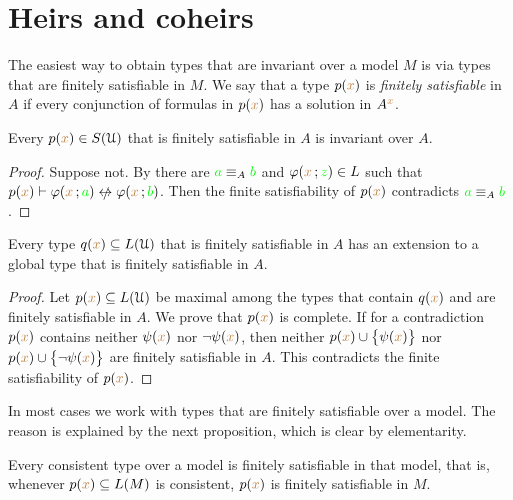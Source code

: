 \section{Heirs and coheirs}
\label{coheirs}

\def\medrel#1{\parbox[t]{6ex}{$\displaystyle\hfil #1$}}
\def\ceq#1#2#3{\parbox[t]{16ex}{$\displaystyle #1$}\medrel{#2}{$\displaystyle #3$}}

The easiest way to obtain types that are invariant over a model $M$ is via types that are finitely satisfiable in $M$.
We say that a type $p({\color{brown} x})$ is \emph{finitely satisfiable\/} in $A$ if every conjunction of formulas in $p({\color{brown} x})$ has a solution in $A^{\color{brown} x}$.

\begin{proposition}\label{prop_coeredi_quasiinvarienti}
  Every $p({\color{brown} x})\in S(\EuScript U)$ that is finitely satisfiable in $A$ is invariant over $A$.
\end{proposition}

\begin{proof}
  Suppose not.
  By  there are ${\color{green} a}\equiv_A{\color{green} b}$ and $\varphi({\color{brown} x}\,;{\color{green} z})\in L$ such that $p({\mr x})\proves\phi({\mr x}\,;{\gr a})\niff\phi({\mr x}\,;{\gr b})$.
  Then the finite satisfiability of $p({\color{brown} x})$ contradicts ${\color{green} a}\equiv_A{\color{green} b}$.
\end{proof}

\begin{proposition}\label{prop_exisntence_coheirs}
  Every type $q({\color{brown} x})\subseteq L(\EuScript U)$ that is finitely satisfiable in $A$ has an extension to a global type that is finitely satisfiable in $A$.
\end{proposition}

\begin{proof}
  Let $p({\color{brown} x})\subseteq L(\EuScript U)$ be maximal among the types that contain $q({\color{brown} x})$ and are finitely satisfiable in $A$.
  We prove that $p({\color{brown} x})$ is complete.
  If for a contradiction $p({\color{brown} x})$ contains neither $\psi({\color{brown} x})$ nor $\neg\psi({\color{brown} x})$, then  neither $p({\color{brown} x})\cup\big\{\psi({\color{brown} x})\big\}$ nor $p({\color{brown} x})\cup\big\{\neg\psi({\color{brown} x})\big\}$ are finitely satisfiable in $A$.
  This contradicts the finite satisfiability of $p({\color{brown} x})$.
\end{proof}

In most cases we work with types that are finitely satisfiable over a model.
The reason is explained by the next proposition, which is clear by elementarity.

\begin{proposition}\label{prop_coher_over_model}
  Every consistent type over a model is finitely satisfiable in that model, that is, whenever $p({\color{brown} x})\subseteq L(M)$ is consistent, $p({\color{brown} x})$ is finitely satisfiable in $M$.
\end{proposition}

